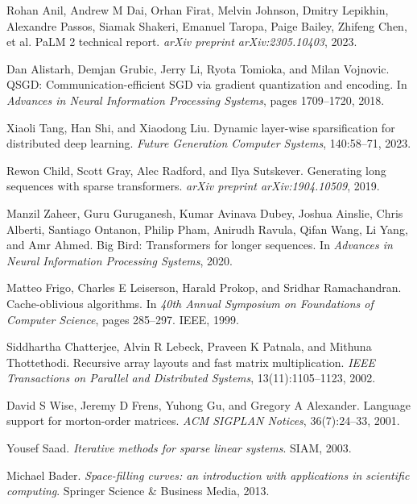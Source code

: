 \documentclass{article}
\numberwithin{equation}{section}
\theoremstyle{plain}
\theoremstyle{definition}
\theoremstyle{remark}
\begin{document}
\begin{thebibliography}{99}
Rohan Anil, Andrew M Dai, Orhan Firat, Melvin Johnson, Dmitry Lepikhin, Alexandre Passos, Siamak Shakeri, Emanuel Taropa, Paige Bailey, Zhifeng Chen, et al.
\newblock PaLM 2 technical report.
\newblock \emph{arXiv preprint arXiv:2305.10403}, 2023.

Dan Alistarh, Demjan Grubic, Jerry Li, Ryota Tomioka, and Milan Vojnovic.
\newblock QSGD: Communication-efficient SGD via gradient quantization and encoding.
\newblock In \emph{Advances in Neural Information Processing Systems}, pages 1709--1720, 2018.

Xiaoli Tang, Han Shi, and Xiaodong Liu.
\newblock Dynamic layer-wise sparsification for distributed deep learning.
\newblock \emph{Future Generation Computer Systems}, 140:58--71, 2023.

Rewon Child, Scott Gray, Alec Radford, and Ilya Sutskever.
\newblock Generating long sequences with sparse transformers.
\newblock \emph{arXiv preprint arXiv:1904.10509}, 2019.

Manzil Zaheer, Guru Guruganesh, Kumar Avinava Dubey, Joshua Ainslie, Chris Alberti, Santiago Ontanon, Philip Pham, Anirudh Ravula, Qifan Wang, Li Yang, and Amr Ahmed.
\newblock Big Bird: Transformers for longer sequences.
\newblock In \emph{Advances in Neural Information Processing Systems}, 2020.

Matteo Frigo, Charles E Leiserson, Harald Prokop, and Sridhar Ramachandran.
\newblock Cache-oblivious algorithms.
\newblock In \emph{40th Annual Symposium on Foundations of Computer Science}, pages 285--297. IEEE, 1999.

Siddhartha Chatterjee, Alvin R Lebeck, Praveen K Patnala, and Mithuna Thottethodi.
\newblock Recursive array layouts and fast matrix multiplication.
\newblock \emph{IEEE Transactions on Parallel and Distributed Systems}, 13(11):1105--1123, 2002.

David S Wise, Jeremy D Frens, Yuhong Gu, and Gregory A Alexander.
\newblock Language support for morton-order matrices.
\newblock \emph{ACM SIGPLAN Notices}, 36(7):24--33, 2001.

Yousef Saad.
\newblock \emph{Iterative methods for sparse linear systems}.
\newblock SIAM, 2003.

Michael Bader.
\newblock \emph{Space-filling curves: an introduction with applications in scientific computing}.
\newblock Springer Science \& Business Media, 2013.


\end{thebibliography}
\end{document}
